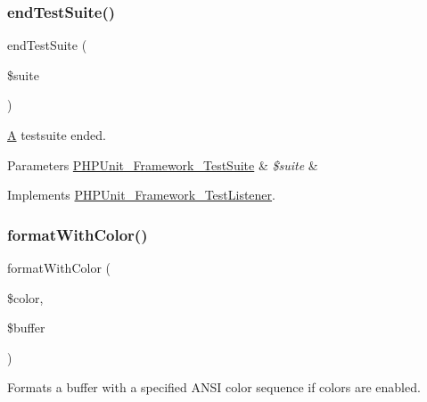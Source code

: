 \subsubsection{\texorpdfstring{end\+Test\+Suite()}{endTestSuite()}}
{\footnotesize\ttfamily end\+Test\+Suite (\begin{DoxyParamCaption}\item[{\mbox{\hyperlink{class_p_h_p_unit___framework___test_suite}{P\+H\+P\+Unit\+\_\+\+Framework\+\_\+\+Test\+Suite}}}]{\$suite }\end{DoxyParamCaption})}

\mbox{\hyperlink{class_a}{A}} testsuite ended.


\begin{DoxyParams}[1]{Parameters}
\mbox{\hyperlink{class_p_h_p_unit___framework___test_suite}{P\+H\+P\+Unit\+\_\+\+Framework\+\_\+\+Test\+Suite}} & {\em \$suite} & \\
\hline
\end{DoxyParams}


Implements \mbox{\hyperlink{interface_p_h_p_unit___framework___test_listener_aeec28a4d1328434916ebcdc1ca6b5527}{P\+H\+P\+Unit\+\_\+\+Framework\+\_\+\+Test\+Listener}}.

\mbox{\label{class_p_h_p_unit___text_u_i___result_printer_a2f73e1cf77fef51b9ec4c83f479e995c}} 
\subsubsection{\texorpdfstring{format\+With\+Color()}{formatWithColor()}}
{\footnotesize\ttfamily format\+With\+Color (\begin{DoxyParamCaption}\item[{}]{\$color,  }\item[{}]{\$buffer }\end{DoxyParamCaption})\hspace{0.3cm}{\ttfamily [protected]}}

Formats a buffer with a specified A\+N\+SI color sequence if colors are enabled.


